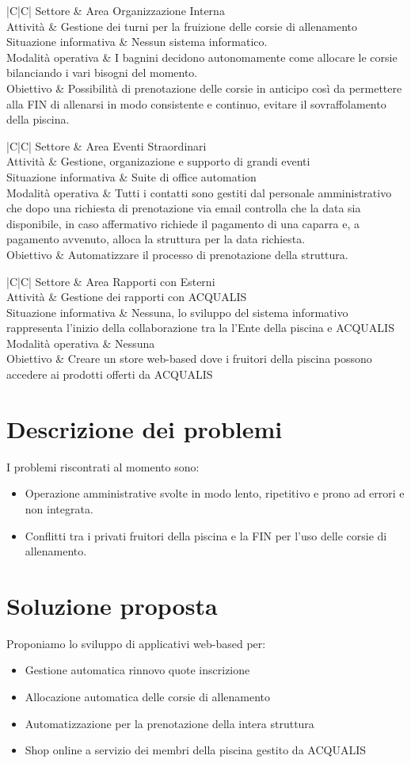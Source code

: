 \documentclass[11pt]{article} %
\newcommand{\AnalisiSituazioneAttualeTabella}[5]{
	\begin{tabulary}{\textwidth}{|C|C|}
		\hline
		Settore & #1 \\ \hline
		Attività & #2 \\ \hline
		Situazione informativa & #3 \\ \hline
		Modalità operativa & #4 \\ \hline
		Obiettivo & #5 \\
		\hline
	\end{tabulary}
}
\begin{document}
\AnalisiSituazioneAttualeTabella
	{Area Organizzazione Interna}
	{Gestione dei turni per la fruizione delle corsie di allenamento}
	{Nessun sistema informatico.}
	{I bagnini decidono autonomamente come allocare le corsie bilanciando i vari bisogni del momento.}
	{Possibilità di prenotazione delle corsie in anticipo così da permettere alla FIN di allenarsi in modo consistente e continuo, evitare il sovraffolamento della piscina.}

\AnalisiSituazioneAttualeTabella
	{Area Eventi Straordinari}
	{Gestione, organizazione e supporto di grandi eventi}
	{Suite di office automation}
	{Tutti i contatti sono gestiti dal personale amministrativo che dopo una richiesta di prenotazione via email controlla che la data sia disponibile, in caso affermativo richiede il pagamento di una caparra e, a pagamento avvenuto, alloca la struttura per la data richiesta.}
	{Automatizzare il processo di prenotazione della struttura.}

\AnalisiSituazioneAttualeTabella
	{Area Rapporti con Esterni}
	{Gestione dei rapporti con ACQUALIS}
	{Nessuna, lo sviluppo del sistema informativo rappresenta l'inizio della collaborazione tra la l'Ente della piscina e ACQUALIS}
	{Nessuna}
	{Creare un store web-based dove i fruitori della piscina possono accedere ai prodotti offerti da ACQUALIS}

\section{Descrizione dei problemi}

I problemi riscontrati al momento sono:

\begin{itemize}

	\item Operazione amministrative svolte in modo lento, ripetitivo e prono ad errori e non integrata.
	\item Conflitti tra i privati fruitori della piscina e la FIN per l'uso delle corsie di allenamento.

\end{itemize}

\section{Soluzione proposta}

Proponiamo lo sviluppo di applicativi web-based per:

\begin{itemize}
	\item Gestione automatica rinnovo quote inscrizione
	\item Allocazione automatica delle corsie di allenamento
	\item Automatizzazione per la prenotazione della intera struttura
	\item Shop online a servizio dei membri della piscina gestito da ACQUALIS
\end{itemize}	
\end{document}
